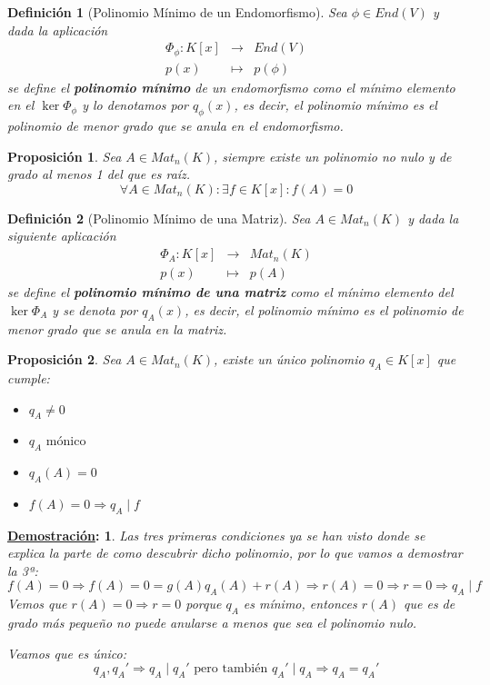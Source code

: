 \documentclass[10pt,a4paper,openright]{book}
\theoremstyle{break}
\newtheorem*{defi}{Definición}
\newtheorem*{prop}{Proposición}
\newtheorem*{demo}{\underline{Demostración}:}
\begin{document}
\begin{defi}[Polinomio Mínimo de un Endomorfismo]
Sea $\phi \in End(V)$ y dada la aplicación
\begin{eqnarray*}
\Phi_\phi:K[x] &\longrightarrow& End(V) \\ p(x) &\longmapsto& p(\phi) 
\end{eqnarray*}
se define el \textbf{polinomio mínimo} de un endomorfismo como el mínimo elemento en el $\ker \Phi_\phi$ y lo denotamos por $q_\phi(x)$, es decir, el polinomio mínimo es el polinomio de menor grado que se anula en el endomorfismo.
\end{defi}

\begin{prop}
Sea $A\in Mat_n(K)$, siempre existe un polinomio no nulo y de grado al menos 1 del que es raíz.
$$\forall A\in Mat_n(K): \exists f\in K[x]: f(A)=0$$
\end{prop}

\begin{defi}[Polinomio Mínimo de una Matriz]
Sea $A\in Mat_n(K)$ y dada la siguiente aplicación
\begin{eqnarray*}
\Phi_A:K[x] &\longrightarrow& Mat_n(K) \\ p(x) &\longmapsto& p(A) 
\end{eqnarray*}
se define el \textbf{polinomio mínimo de una matriz} como el mínimo elemento del $\ker \Phi_A$ y se denota por $q_A(x)$, es decir, el polinomio mínimo es el polinomio de menor grado que se anula en la matriz.
\end{defi}

\begin{prop}
Sea $A\in Mat_n(K)$, existe un único polinomio $q_A\in K[x]$ que cumple:
\begin{itemize}
\item $q_A\neq 0$
\item $q_A \mbox{ mónico }$
\item $q_A(A)=0$
\item $f(A)=0\Rightarrow q_A\mid f$
\end{itemize}
\end{prop}
\begin{demo}
Las tres primeras condiciones ya se han visto donde se explica la parte de como descubrir dicho polinomio, por lo que vamos a demostrar la 3ª:
$$f(A) = 0 \Rightarrow f(A)=0= g(A)q_A(A)+r(A)\Rightarrow r(A)=0\Rightarrow r=0\Rightarrow q_A\mid f$$
Vemos que $r(A)=0\Rightarrow r=0$ porque $q_A$ es mínimo, entonces $r(A)$ que es de grado más pequeño no puede anularse a menos que sea el polinomio nulo.

Veamos que es único:
$$q_A, q_A'\Rightarrow q_A\mid q_A' \mbox{ pero también }q_A'\mid q_A \Rightarrow q_A = q_A'$$
\end{demo}
\end{document}
